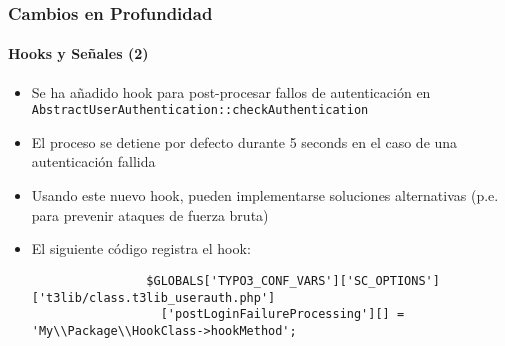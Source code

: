 \begin{frame}[fragile]
	\frametitle{Cambios en Profundidad}
	\framesubtitle{Hooks y Señales (2)}

	\lstset{basicstyle=\tiny\ttfamily}

	\begin{itemize}

		\item Se ha añadido hook para post-procesar fallos de autenticación en \texttt{AbstractUserAuthentication::checkAuthentication}

		\item El proceso se detiene por defecto durante 5 seconds en el caso de una autenticación fallida

		\item Usando este nuevo hook, pueden implementarse soluciones alternativas
			(p.e. para prevenir ataques de fuerza bruta)

		\item El siguiente código registra el hook:

			\begin{lstlisting}
				$GLOBALS['TYPO3_CONF_VARS']['SC_OPTIONS']['t3lib/class.t3lib_userauth.php']
				  ['postLoginFailureProcessing'][] = 'My\\Package\\HookClass->hookMethod';
			\end{lstlisting}

	\end{itemize}

\end{frame}


